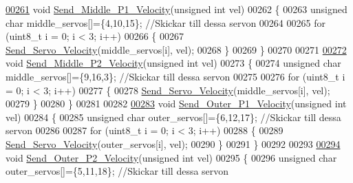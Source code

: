 \begin{DoxyCode}
\hypertarget{servo___u_a_r_t_8c_source.tex_l00261}{}\hyperlink{servo___u_a_r_t_8h_a63e528b1a0c31e9912ebbceee58a5faa}{00261} \textcolor{keywordtype}{void} \hyperlink{servo___u_a_r_t_8c_a63e528b1a0c31e9912ebbceee58a5faa}{Send\_Middle\_P1\_Velocity}(\textcolor{keywordtype}{unsigned} \textcolor{keywordtype}{int} vel)
00262 \{   
00263     \textcolor{keywordtype}{unsigned} \textcolor{keywordtype}{char} middle\_servos[]=\{4,10,15\}; \textcolor{comment}{//Skickar till dessa servon }
00264         
00265     \textcolor{keywordflow}{for} (uint8\_t i = 0; i < 3; i++)
00266     \{
00267         \hyperlink{servo___u_a_r_t_8c_ac325c1636bc0a1c5b6cbe967bca0a6d2}{Send\_Servo\_Velocity}(middle\_servos[i], vel);
00268     \}
00269 \}
00270 
00271 
\hypertarget{servo___u_a_r_t_8c_source.tex_l00272}{}\hyperlink{servo___u_a_r_t_8h_aae94fcd8998679345fa7d70648bd2a1e}{00272} \textcolor{keywordtype}{void} \hyperlink{servo___u_a_r_t_8c_aae94fcd8998679345fa7d70648bd2a1e}{Send\_Middle\_P2\_Velocity}(\textcolor{keywordtype}{unsigned} \textcolor{keywordtype}{int} vel)
00273 \{   
00274     \textcolor{keywordtype}{unsigned} \textcolor{keywordtype}{char} middle\_servos[]=\{9,16,3\}; \textcolor{comment}{//Skickar till dessa servon }
00275         
00276     \textcolor{keywordflow}{for} (uint8\_t i = 0; i < 3; i++)
00277     \{
00278         \hyperlink{servo___u_a_r_t_8c_ac325c1636bc0a1c5b6cbe967bca0a6d2}{Send\_Servo\_Velocity}(middle\_servos[i], vel);
00279     \}
00280 \}
00281 
00282 
\hypertarget{servo___u_a_r_t_8c_source.tex_l00283}{}\hyperlink{servo___u_a_r_t_8h_a30fbb081db7418d454bfe8761ca59dd2}{00283} \textcolor{keywordtype}{void} \hyperlink{servo___u_a_r_t_8c_a30fbb081db7418d454bfe8761ca59dd2}{Send\_Outer\_P1\_Velocity}(\textcolor{keywordtype}{unsigned} \textcolor{keywordtype}{int} vel)
00284 \{   
00285     \textcolor{keywordtype}{unsigned} \textcolor{keywordtype}{char} outer\_servos[]=\{6,12,17\}; \textcolor{comment}{//Skickar till dessa servon }
00286         
00287     \textcolor{keywordflow}{for} (uint8\_t i = 0; i < 3; i++)
00288     \{
00289         \hyperlink{servo___u_a_r_t_8c_ac325c1636bc0a1c5b6cbe967bca0a6d2}{Send\_Servo\_Velocity}(outer\_servos[i], vel);
00290     \}
00291 \}
00292 
00293 
\hypertarget{servo___u_a_r_t_8c_source.tex_l00294}{}\hyperlink{servo___u_a_r_t_8h_a6c4f4c2915df647ac40c86c17e613e30}{00294} \textcolor{keywordtype}{void} \hyperlink{servo___u_a_r_t_8c_a6c4f4c2915df647ac40c86c17e613e30}{Send\_Outer\_P2\_Velocity}(\textcolor{keywordtype}{unsigned} \textcolor{keywordtype}{int} vel)
00295 \{   
00296     \textcolor{keywordtype}{unsigned} \textcolor{keywordtype}{char} outer\_servos[]=\{5,11,18\}; \textcolor{comment}{//Skickar till dessa servon }

\end{DoxyCode}
